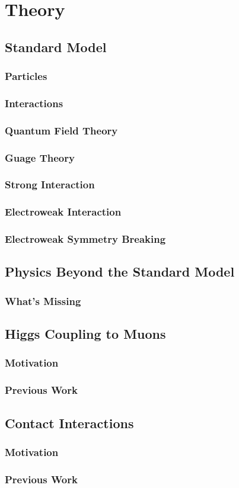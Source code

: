 \chapter{Theory}

\section{Standard Model}
\subsection{Particles}
\subsection{Interactions}
\subsection{Quantum Field Theory}
\subsection{Guage Theory}
\subsection{Strong Interaction}
\subsection{Electroweak Interaction}
\subsection{Electroweak Symmetry Breaking}


\section{Physics Beyond the Standard Model}
\subsection{What's Missing}

\section{Higgs Coupling to Muons}
\subsection{Motivation}
\subsection{Previous Work}

\section{Contact Interactions}
\subsection{Motivation}
\subsection{Previous Work}
